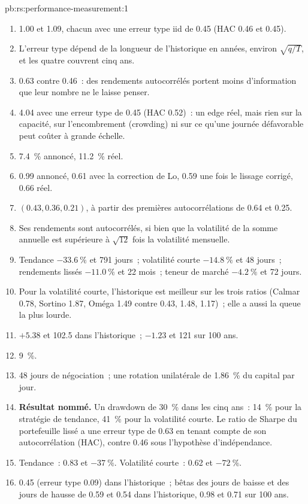 \begin{solution}{pb:rs:performance-measurement:1}
\begin{enumerate}
\item 1.00 et 1.09, chacun avec une erreur type iid de 0.45 (HAC 0.46 et 0.45).
\item L'erreur type dépend de la longueur de l'historique en années, environ $\sqrt{q/T}$, et les quatre couvrent cinq ans.
\item 0.63 contre 0.46~: des rendements autocorrélés portent moins d'information que leur nombre ne le laisse penser.
\item 4.04 avec une erreur type de 0.45 (HAC 0.52)~: un edge réel, mais rien sur la capacité, sur l'encombrement (crowding) ni sur ce qu'une journée défavorable peut coûter à grande échelle.
\item 7.4~\% annoncé, 11.2~\% réel.
\item 0.99 annoncé, 0.61 avec la correction de Lo, 0.59 une fois le lissage corrigé, 0.66 réel.
\item $(0.43, 0.36, 0.21)$, à partir des premières autocorrélations de 0.64 et 0.25.
\item Ses rendements sont autocorrélés, si bien que la volatilité de la somme annuelle est supérieure à $\sqrt{12}$ fois la volatilité mensuelle.
\item Tendance $-33.6~\%$ et 791 jours~; volatilité courte $-14.8~\%$ et 48 jours~; rendements lissés $-11.0~\%$ et 22 mois~; teneur de marché $-4.2~\%$ et 72 jours.
\item Pour la volatilité courte, l'historique est meilleur sur les trois ratios (Calmar 0.78, Sortino 1.87, Oméga 1.49 contre 0.43, 1.48, 1.17)~; elle a aussi la queue la plus lourde.
\item $+5.38$ et 102.5 dans l'historique~; $-1.23$ et 121 sur 100 ans.
\item 9~\%.
\item 48 jours de négociation~; une rotation unilatérale de 1.86~\% du capital par jour.
\item \textbf{Résultat nommé.} Un drawdown de 30~\% dans les cinq ans~: 14~\% pour la stratégie de tendance, 41~\% pour la volatilité courte. Le ratio de Sharpe du portefeuille lissé a une
erreur type de 0.63 en tenant compte de son autocorrélation (HAC), contre 0.46 sous l'hypothèse d'indépendance.
\item Tendance~: 0.83 et $-37~\%$. Volatilité courte~: 0.62 et $-72~\%$.
\item 0.45 (erreur type 0.09) dans l'historique~; bêtas des jours de baisse et des jours de hausse de 0.59 et 0.54 dans l'historique, 0.98 et 0.71 sur 100 ans.

\end{enumerate}
\end{solution}
